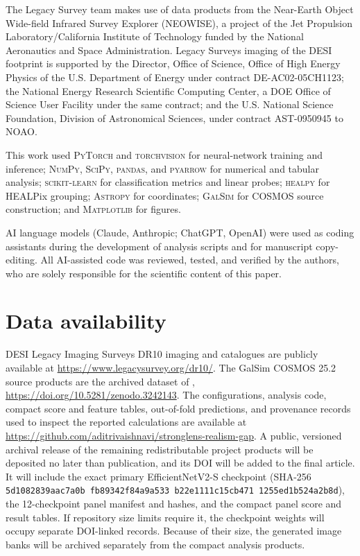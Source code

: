 The Legacy Survey team makes use of data products from the Near-Earth Object
Wide-field Infrared Survey Explorer (NEOWISE), a project of the Jet Propulsion
Laboratory/California Institute of Technology funded by the National
Aeronautics and Space Administration. Legacy Surveys imaging of the DESI
footprint is supported by the Director, Office of Science, Office of High
Energy Physics of the U.S. Department of Energy under contract
DE-AC02-05CH1123; the National Energy Research Scientific Computing Center, a
DOE Office of Science User Facility under the same contract; and the U.S.
National Science Foundation, Division of Astronomical Sciences, under contract
AST-0950945 to NOAO.

This work used \textsc{PyTorch} and \textsc{torchvision} for neural-network
training and inference; \textsc{NumPy}, \textsc{SciPy}, \textsc{pandas}, and
\textsc{pyarrow} for numerical and tabular analysis; \textsc{scikit-learn} for
classification metrics and linear probes; \textsc{healpy} for HEALPix
grouping; \textsc{Astropy} for coordinates; \textsc{GalSim} for COSMOS source
construction; and \textsc{Matplotlib} for figures.

AI language models (Claude, Anthropic; ChatGPT, OpenAI) were used as coding
assistants during the development of analysis scripts and for manuscript
copy-editing. All AI-assisted code was reviewed, tested, and verified by the
authors, who are solely responsible for the scientific content of this paper.

\section*{Data availability}

DESI Legacy Imaging Surveys DR10 imaging and catalogues are publicly available
at \url{https://www.legacysurvey.org/dr10/}. The GalSim COSMOS 25.2 source
products are the archived dataset of \citet{Mandelbaum2012},
\url{https://doi.org/10.5281/zenodo.3242143}.
The configurations, analysis code, compact score and feature tables,
out-of-fold predictions, and provenance records used to inspect the reported
calculations are available at
\url{https://github.com/aditrivaishnavi/stronglens-realism-gap}. A public,
versioned archival release of the remaining redistributable project products
will be deposited no later than publication, and its DOI will be added to the
final article. It will include the exact primary EfficientNetV2-S checkpoint
(SHA-256
\texttt{5d1082839aac7a0b\allowbreak
fb89342f84a9a533\allowbreak
b22e1111c15cb471\allowbreak
1255ed1b524a2b8d}), the 12-checkpoint panel manifest and hashes, and the
compact panel score and result tables. If repository size limits require it,
the checkpoint weights will occupy separate DOI-linked records. Because of
their size, the generated image banks will be archived separately from the
compact analysis products.

